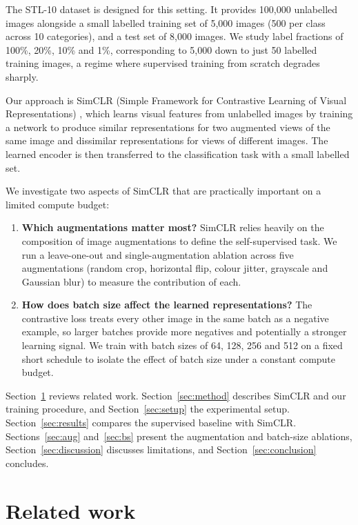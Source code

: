 \documentclass[11pt,a4paper]{article}
\begin{document}
The STL-10 dataset \citep{coates2011} is designed for this setting. It provides 100,000 unlabelled images
alongside a small labelled training set of 5,000 images (500 per class across 10 categories), and a test set
of 8,000 images. We study label fractions of 100\%, 20\%, 10\% and 1\%, corresponding to 5,000 down to just 50
labelled training images, a regime where supervised training from scratch degrades sharply.

Our approach is SimCLR (Simple Framework for Contrastive Learning of Visual Representations)
\citep{chen2020}, which learns visual features from unlabelled images by training a network to produce similar
representations for two augmented views of the same image and dissimilar representations for views of
different images. The learned encoder is then transferred to the classification task with a small labelled set.

We investigate two aspects of SimCLR that are practically important on a limited compute budget:
\begin{enumerate}
  \item \textbf{Which augmentations matter most?} SimCLR relies heavily on the composition of image
  augmentations to define the self-supervised task. We run a leave-one-out and single-augmentation ablation
  across five augmentations (random crop, horizontal flip, colour jitter, grayscale and Gaussian blur) to
  measure the contribution of each.
  \item \textbf{How does batch size affect the learned representations?} The contrastive loss treats every
  other image in the same batch as a negative example, so larger batches provide more negatives and
  potentially a stronger learning signal. We train with batch sizes of 64, 128, 256 and 512 on a fixed short
  schedule to isolate the effect of batch size under a constant compute budget.
\end{enumerate}

Section~\ref{sec:related} reviews related work. Section~\ref{sec:method} describes SimCLR and our training
procedure, and Section~\ref{sec:setup} the experimental setup. Section~\ref{sec:results} compares the
supervised baseline with SimCLR. Sections~\ref{sec:aug} and~\ref{sec:bs} present the augmentation and
batch-size ablations, Section~\ref{sec:discussion} discusses limitations, and Section~\ref{sec:conclusion}
concludes.

\section{Related work}\label{sec:related}
\end{document}
